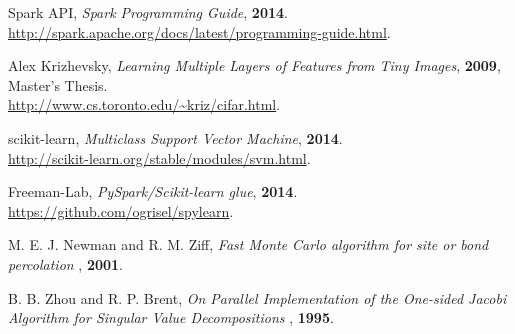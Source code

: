 \documentclass[a4paper]{article}
\begin{document}
\begin{thebibliography}{}

 Spark API, \emph{Spark Programming Guide}, \textbf{2014}.\\
\url{http://spark.apache.org/docs/latest/programming-guide.html}.

 Alex Krizhevsky, \emph{Learning Multiple Layers of Features from Tiny Images}, \textbf{2009}, Master's Thesis.\\
\url{http://www.cs.toronto.edu/~kriz/cifar.html}.

 scikit-learn, \emph{Multiclass Support Vector Machine}, \textbf{2014}.\\
\url{http://scikit-learn.org/stable/modules/svm.html}.

 Freeman-Lab, \emph{PySpark/Scikit-learn glue}, \textbf{2014}.\\
\url{https://github.com/ogrisel/spylearn}.

 M. E. J. Newman and R. M. Ziff, \emph{Fast Monte Carlo algorithm for site or bond percolation
}, \textbf{2001}.

 B. B. Zhou and R. P. Brent, \emph{On Parallel Implementation of the One-sided Jacobi Algorithm for Singular Value Decompositions
}, \textbf{1995}.

\end{thebibliography}
\end{document}
